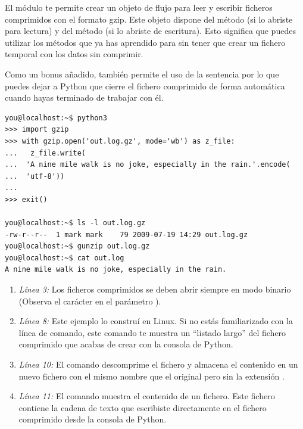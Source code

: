 El módulo  te permite crear un objeto de flujo para leer y escribir ficheros comprimidos con el formato gzip. Este objeto dispone del método  (si lo abriste para lectura) y del método  (si lo abriste de escritura). Esto significa que puedes utilizar los métodos que ya has aprendido para  sin tener que crear un fichero temporal con los datos sin comprimir.

Como un bonus añadido, también permite el uso de la sentencia  por lo que puedes dejar a Python que cierre el fichero comprimido de forma automática cuando hayas terminado de trabajar con él.

\noindent\begin{minipage}{\textwidth}
\begin{lstlisting}[mathescape=False]
you@localhost:~$ python3
>>> import gzip
>>> with gzip.open('out.log.gz', mode='wb') as z_file:
...   z_file.write(
...  'A nine mile walk is no joke, especially in the rain.'.encode(
...  'utf-8'))
... 
>>> exit()

you@localhost:~$ ls -l out.log.gz
-rw-r--r--  1 mark mark    79 2009-07-19 14:29 out.log.gz
you@localhost:~$ gunzip out.log.gz
you@localhost:~$ cat out.log
A nine mile walk is no joke, especially in the rain.
\end{lstlisting}
\end{minipage}

\begin{enumerate}

\item \emph{Línea 3:} Los ficheros comprimidos se deben abrir siempre en modo binario (Observa el carácter  en el parámetro ).

\item \emph{Línea 8:} Este ejemplo lo construí en Linux. Si no estás familiarizado con la línea de comando, este comando te muestra un ``listado largo'' del fichero comprimido que acabas de crear con la consola de Python. 

\item \emph{Línea 10:} El comando  descomprime el fichero y almacena el contenido en un nuevo fichero con el mismo nombre que el original pero sin la extensión .

\item \emph{Línea 11:} El comando  muestra el contenido de un fichero. Este fichero contiene la cadena de texto que escribiste directamente en el fichero comprimido  desde la consola de Python.

\end{enumerate}

